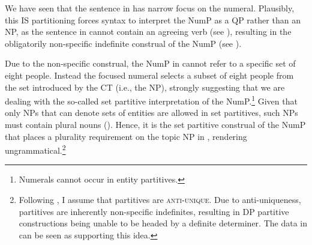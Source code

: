 \documentclass[output=paper,
modfonts,
newtxmath,
hidelinks
]{langscibook}
\begin{document}
\noindent We have seen that the sentence in  has narrow focus on the numeral. Plausibly, this IS partitioning forces syntax to interpret the NumP as a QP rather than an NP, as the sentence in  cannot contain an agreeing verb (see ), resulting in the obligatorily non-specific indefinite construal of the NumP (see ).

\label{ex24}
\z
 \label{ex25}
\z

\noindent Due to the non-specific construal, the NumP in  cannot refer to a specific set of eight people. Instead the focused numeral selects a subset of eight people from the set introduced by the CT (i.e., the NP), strongly suggesting that we are dealing with the so-called set partitive interpretation of the NumP.\footnote{\label{fn20}Numerals cannot occur in entity partitives.}
Given that only NPs that can denote sets of entities are allowed in set partitives, such NPs must contain plural nouns (\citealt{deHoop1997}). Hence, it is the set partitive construal of the NumP that places a plurality requirement on the topic NP in , rendering  ungrammatical.\footnote{\label{fn21}Following \citet{Barker1998}, I assume that partitives are \textsc{anti-unique}. Due to anti-uniqueness, partitives are inherently non-specific indefinites, resulting in DP partitive constructions being unable to be headed by a definite determiner. The data in  can be seen as supporting this idea.}

\end{document}
